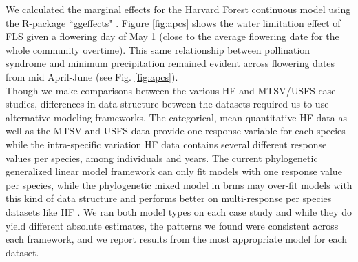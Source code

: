 \documentclass[11pt]{article}\usepackage[]{graphicx}\usepackage[]{color}
\begin{document}
{%
%
%


\indent We calculated the marginal effects for the Harvard Forest continuous model using the R-package ``ggeffects" \citep{Ludecke2018}. Figure \ref{fig:apcs} shows the water limitation effect of FLS given a flowering day of May 1 (close to the average flowering date for the whole community overtime). This same relationship between pollination syndrome and minimum precipitation remained evident across flowering dates from mid April-June (see Fig. \ref{fig:apcs}). \\

\noindent Though we make comparisons between the various HF and MTSV/USFS case studies, differences in data structure between the datasets required us to use alternative modeling frameworks. The categorical, mean quantitative HF data as well as the MTSV and USFS data provide one response variable for each species while the intra-specific variation HF data contains several different response values per species, among individuals and years. The current phylogenetic generalized linear model framework can only fit models with one response value per species, while the phylogenetic mixed model in brms may over-fit models with this kind of data structure and performs better on multi-response per species datasets like HF \citep{BurknerPC}. We ran both model types on each case study and while they do yield different absolute estimates, the patterns we found were consistent across each framework, and we report results from the most appropriate model for each dataset.\\

}
\end{document}
